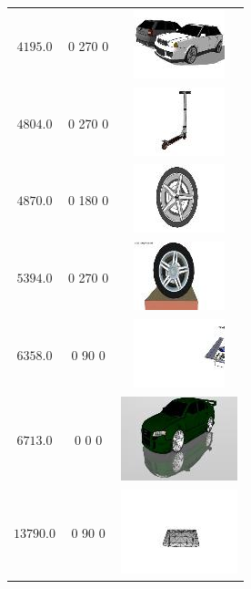 \begin{longtable}{ccc}
	$4195.0$ & 0 270 0 & \includegraphics{models/ea2e72d61e04c7b82e877e82c90c24d.jpg}\\
	$4804.0$ & 0 270 0 & \includegraphics{models/fe2eff37752a611cd6a836ac7fa0d88e.jpg}\\
	$4870.0$ & 0 180 0 & \includegraphics{models/98c3ac5359eeb0e074a9f7ad6e3a842e.jpg}\\
	$5394.0$ & 0 270 0 & \includegraphics{models/dd39f7ab4a40cce6af4c49277e1cff9d.jpg}\\
	$6358.0$ & 0 90 0 & \includegraphics{models/f31d86ab074f8e2fa18e9d609efc095c.jpg}\\
	$6713.0$ & 0 0 0 & \includegraphics{models/9ff6cc349ca1b1167315f56293bccb8b.jpg}\\
	$13790.0$ & 0 90 0 & \includegraphics{models/2e75852e397d44bc3882d94aafda5ee0.jpg}\\

\end{longtable}

